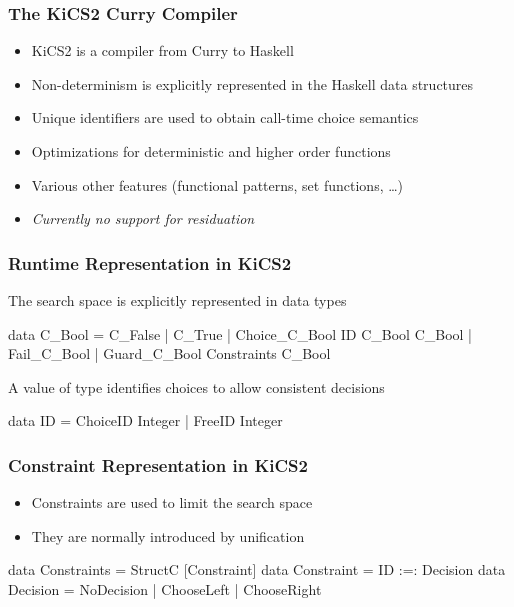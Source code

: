 \documentclass[
,hyperref={pdfpagelabels=false}
,xcolor=dvipsnames
]{beamer}
\begin{document}
\begin{frame}[fragile]%
\frametitle{The KiCS2 Curry Compiler}
\begin{itemize}
\item KiCS2 is a compiler from Curry to Haskell
\item Non-determinism is explicitly represented in
      the Haskell data structures
\item Unique identifiers are used to obtain
      call-time choice semantics
\item Optimizations for deterministic and higher order functions
\item Various other features (functional patterns, set functions, \dots)
\item \emph{Currently no support for residuation}
\end{itemize}
\end{frame}

\begin{frame}[fragile]%
\frametitle{Runtime Representation in KiCS2}

The search space is explicitly represented in data types
\begin{haskell}
data C_Bool
  = C_False
  | C_True
  | Choice_C_Bool ID C_Bool C_Bool
  | Fail_C_Bool
  | Guard_C_Bool Constraints C_Bool
\end{haskell}

A value of type  identifies choices to allow consistent decisions
\begin{haskell}
data ID = ChoiceID Integer
        | FreeID Integer
\end{haskell}
\end{frame}

\begin{frame}[fragile]%
\frametitle{Constraint Representation in KiCS2}

\begin{itemize}
\item Constraints are used to limit the search space
\item They are normally introduced by unification
\end{itemize}

\begin{haskell}
data Constraints = StructC [Constraint] \medskip
data Constraint = ID :=: Decision \medskip
data Decision = NoDecision
              | ChooseLeft
              | ChooseRight
\end{haskell}
\end{frame}
\end{document}
